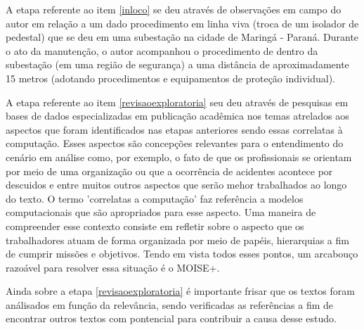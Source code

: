 A etapa referente ao item \ref{inloco} se deu através de observações em campo do autor em relação a um dado procedimento em linha viva (troca de um isolador de pedestal) que se deu em uma subestação na cidade de Maringá - Paraná. Durante o ato da manutenção, o autor acompanhou o procedimento de dentro da subestação (em uma região de segurança) a uma distância de aproximadamente 15 metros (adotando procedimentos e equipamentos de proteção individual).

A etapa referente ao item \ref{revisaoexploratoria} seu deu através de pesquisas em bases de dados especializadas em publicação acadêmica nos temas atrelados aos aspectos que foram identificados nas etapas anteriores sendo essas correlatas à computação. Esses aspectos são concepções relevantes para o entendimento do cenário em análise como, por exemplo,  o fato de que os profissionais se orientam por meio de uma organização ou que a ocorrência de acidentes acontece por descuidos e entre muitos outros aspectos que serão mehor trabalhados ao longo do texto. O termo 'correlatas a computação' faz referência a modelos computacionais que são apropriados para esse aspecto. Uma maneira de compreender esse contexto consiste em refletir sobre o aspecto que os trabalhadores atuam de forma organizada por meio de papéis, hierarquias a fim de cumprir missões e objetivos. Tendo em vista todos esses pontos, um arcabouço razoável para resolver essa situação é o MOISE+. 

Ainda sobre a etapa \ref{revisaoexploratoria} é importante frisar que os textos foram análisados em função da relevância, sendo verificadas as referências a fim de encontrar outros textos com pontencial para contribuir a causa desse estudo.